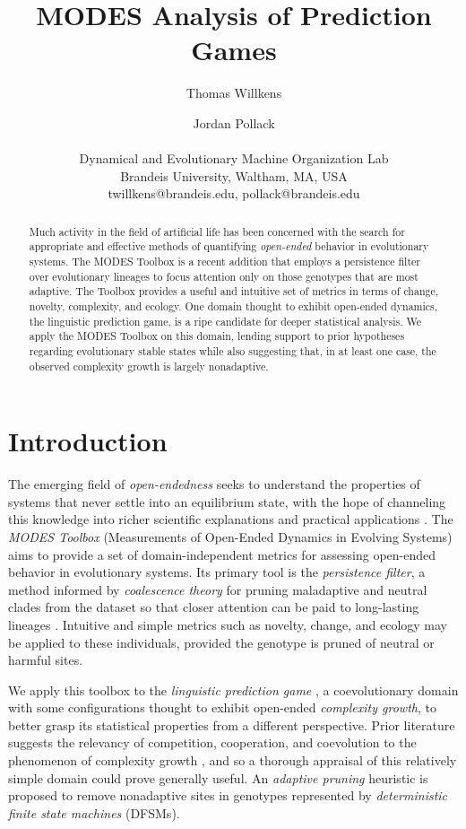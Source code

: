 \documentclass[letterpaper]{article}
\title{MODES Analysis of Prediction Games}
\author {Thomas Willkens \and Jordan Pollack\\
\mbox{} \\
Dynamical and Evolutionary Machine Organization Lab \\ 
Brandeis University, Waltham, MA, USA \\
twillkens@brandeis.edu, pollack@brandeis.edu
}
\newif\ifhidefigures %
\begin{document}
\hidefigurestrue %
\maketitle





\begin{abstract}
Much activity in the field of artificial life has been concerned with the search for appropriate and effective methods of quantifying \textit{open-ended} behavior in evolutionary systems. The MODES Toolbox is a recent addition that employs a persistence filter over evolutionary lineages to focus attention only on those genotypes that are most adaptive. The Toolbox provides a useful and intuitive set of metrics in terms of change, novelty, complexity, and ecology. One domain thought to exhibit open-ended dynamics, the linguistic prediction game, is a ripe candidate for deeper statistical analysis. We apply the MODES Toolbox on this domain, lending support to prior hypotheses regarding evolutionary stable states while also suggesting that, in at least one case, the observed complexity growth is largely nonadaptive. 
\end{abstract}

\section{Introduction}

The emerging field of \textit{open-endedness} seeks to understand the properties of systems that never settle into an equilibrium state, with the hope of channeling this knowledge into richer scientific explanations and practical applications \citep{OEE4-2021, stanley2019,stepney2021,soros2018,taylor2019}. The \textit{MODES Toolbox} (Measurements of Open-Ended Dynamics in Evolving Systems) \citep{dolson2019} aims to provide a set of domain-independent metrics for assessing open-ended behavior in evolutionary systems. Its primary tool is the \textit{persistence filter}, a method informed by \textit{coalescence theory} for pruning maladaptive and neutral clades from the dataset so that closer attention can be paid to long-lasting lineages \citep{Fu1999CoalescingIT}. Intuitive and simple metrics such as novelty, change, and ecology may be applied to these individuals, provided the genotype is pruned of neutral or harmful sites. 

We apply this toolbox to the \textit{linguistic prediction game} \citep{moran2019}, a coevolutionary domain with some configurations thought to exhibit open-ended \textit{complexity growth}, to better grasp its statistical properties from a different perspective. Prior literature suggests the relevancy of competition, cooperation, and coevolution to the phenomenon of complexity growth \citep{zaman2014,Soros2014IdentifyingNC,dolson2021}, and so a thorough appraisal of this relatively simple domain could prove generally useful. An \textit{adaptive pruning} heuristic is proposed to remove nonadaptive sites in genotypes represented by \textit{deterministic finite state machines} (DFSMs). 
\end{document}
